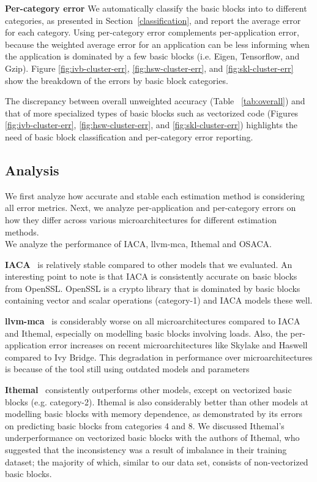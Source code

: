 \textbf{Per-category error} 
We automatically classify the basic blocks into
to different categories, as presented in Section~\ref{classification},
and report the average error for each category.
Using per-category error complements per-application error,
because the weighted average error for an application can be less informing 
when the application is dominated by a few basic blocks
(i.e. Eigen, Tensorflow, and Gzip).
Figure \ref{fig:ivb-cluster-err}, \ref{fig:hsw-cluster-err}, 
and \ref{fig:skl-cluster-err} show the breakdown of the errors by basic block categories.

The discrepancy between overall unweighted accuracy (Table ~\ref{tab:overall})
and that of more specialized types of basic blocks
such as vectorized code (Figures \ref{fig:ivb-cluster-err},
\ref{fig:hsw-cluster-err},
and \ref{fig:skl-cluster-err}) highlights
the need of basic block classification and per-category error reporting.

\subsection{Analysis}
 We first analyze how accurate and stable each estimation method is considering all error metrics. Next, we analyze per-application and per-category errors on how they differ across various microarchitectures for different estimation methods.\\
 
We analyze the performance of IACA, llvm-mca, Ithemal and OSACA.
 
 \textbf{IACA}~\cite{iaca} is relatively stable compared to other models that we evaluated.
An interesting point to note is that IACA is consistently accurate on basic blocks from OpenSSL. 
OpenSSL is a crypto library that is dominated by basic blocks containing vector and scalar operations
(category-1) and IACA models these well. 

    \textbf{llvm-mca}~\cite{llvm-mca} is considerably worse on all microarchitectures compared to IACA and Ithemal,
especially on modelling basic blocks involving loads. Also, the per-application error increases on recent microarchitectures like Skylake and Haswell compared to Ivy Bridge.
This degradation in performance over microarchitectures is because of the tool still using outdated models and parameters

\textbf{Ithemal}~\cite{ithemal} consistently outperforms other models, except on vectorized basic blocks (e.g. category-2).
Ithemal is also considerably better than other models at modelling basic blocks with memory dependence,
as demonstrated by its errors on predicting basic blocks from categories 4 and 8.
We discussed Ithemal's underperformance on vectorized basic blocks with the authors of Ithemal, who suggested that the inconsistency
was a result of imbalance in their training dataset;
the majority of which, similar to our data set, consists of non-vectorized basic blocks.

